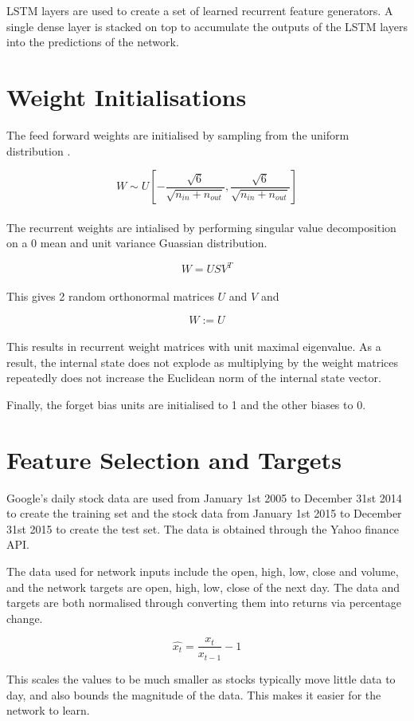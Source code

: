 \documentclass[11pt]{article}
\begin{document}
LSTM layers are used to create a set of learned recurrent feature generators. A single dense layer is stacked on top to accumulate the outputs of the LSTM layers into the predictions of the network.

\section{Weight Initialisations}

The feed forward weights are initialised by sampling from the uniform distribution \cite{FFDiff}.

\[W \sim U \left[ -\frac{\sqrt{6}}{\sqrt{n_{in} + n_{out}}}, \frac{\sqrt{6}}{\sqrt{n_{in} + n_{out}}} \right] \]
\\

The recurrent weights are intialised by performing singular value decomposition on a 0 mean and unit variance Guassian distribution.

\[W = U S V^T\]
\\
This gives 2 random orthonormal matrices $U$ and $V$ and

\[W := U\]
\\
This results in recurrent weight matrices with unit maximal eigenvalue. As a result, the internal state does not explode as multiplying by the weight matrices repeatedly does not increase the Euclidean norm of the internal state vector.

Finally, the forget bias units are initialised to 1 and the other biases to 0.

\section{Feature Selection and Targets}

Google's daily stock data are used from January 1st 2005 to December 31st 2014 to create the training set and the stock data from January 1st 2015 to December 31st 2015 to create the test set. The data is obtained through the Yahoo finance API.

The data used for network inputs include the open, high, low, close and volume, and the network targets are open, high, low, close of the next day. The data and targets are both normalised through converting them into returns via percentage change.

\[ \hat{x_t} = \frac{x_t}{x_{t-1}} - 1 \]

This scales the values to be much smaller as stocks typically move little data to day, and also bounds the magnitude of the data. This makes it easier for the network to learn.
\end{document}
